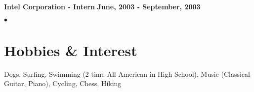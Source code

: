 \documentclass[margin,line]{res}
\newenvironment{list2}{
  \begin{list}{$\bullet$}{%
      \setlength{\itemsep}{0in}
      \setlength{\parsep}{0in} \setlength{\parskip}{0in}
      \setlength{\topsep}{0in} \setlength{\partopsep}{0in} 
      \setlength{\leftmargin}{0.2in}}}{\end{list}}
\begin{document}
\begin{resume}
{\bf Intel Corporation - Intern} \hfill {\bf June, 2003 - September, 2003}
\begin{list2}
\end{list2} 


\section{\sc Hobbies \& Interest}
Dogs, Surfing, Swimming (2 time All-American in High School), Music (Classical Guitar, Piano), Cycling, Chess, Hiking

\end{resume}
\end{document}
